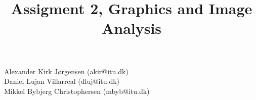 \documentclass{article}
\title{Assigment 2, Graphics and Image Analysis}
\begin{document}
	\maketitle
	\begin{center}
	Alexander Kirk Jørgensen (akir@itu.dk)\\
	Daniel Lujan Villarreal (dluj@itu.dk)\\
	Mikkel Bybjerg Christophersen (mbyb@itu.dk)\\
		
	\newpage
	\tableofcontents
	\newpage
	\end{center}
	
	
\end{document}
